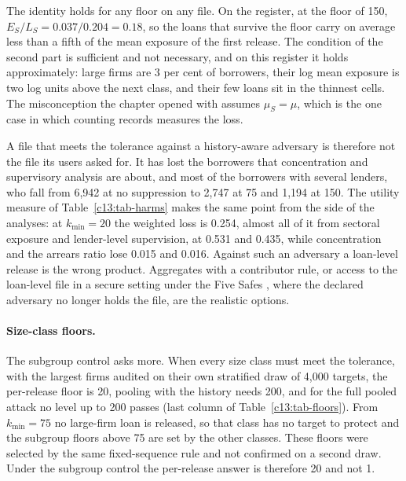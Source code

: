 The identity holds for any floor on any file. On the register, at the floor of 150,
$E_S/L_S = 0.037/0.204 = 0.18$, so the loans that survive the floor carry on average
less than a fifth of the mean exposure of the first release.
The condition of the second part is sufficient and not necessary, and on this
register it holds approximately: large firms are 3 per cent of borrowers, their log
mean exposure is two log units above the next class, and their few loans sit in the
thinnest cells. The misconception the chapter opened with assumes $\mu_S = \mu$, which
is the one case in which counting records measures the loss.

A file that meets the tolerance against a history-aware adversary is therefore not
the file its users asked for. It has lost the borrowers that concentration and
supervisory analysis are about, and most of the borrowers with several lenders, who
fall from 6{,}942 at no suppression to 2{,}747 at 75 and 1{,}194 at 150.
The utility measure of Table~\ref{c13:tab-harms} makes the same point from the side of
the analyses: at $k_{\min}=20$ the weighted loss is 0.254, almost all of it from
sectoral exposure and lender-level supervision, at 0.531 and 0.435, while
concentration and the arrears ratio lose 0.015 and 0.016.
Against such an adversary a loan-level release is the wrong product. Aggregates with a
contributor rule, or access to the loan-level file in a secure setting under the Five
Safes \citep{desai2016}, where the declared adversary no longer holds the file, are the
realistic options.

\paragraph{Size-class floors.} The subgroup control asks more. When every size class
must meet the tolerance, with the largest firms audited on their own stratified draw
of 4{,}000 targets, the per-release floor is 20, pooling with the history needs 200,
and for the full pooled attack no level up to 200 passes (last column of
Table~\ref{c13:tab-floors}). From $k_{\min}=75$ no large-firm loan is released, so
that class has no target to protect and the subgroup floors above 75 are set by the
other classes. These floors were selected by the same fixed-sequence rule and not
confirmed on a second draw. Under the subgroup control the per-release answer is
therefore 20 and not 1.

